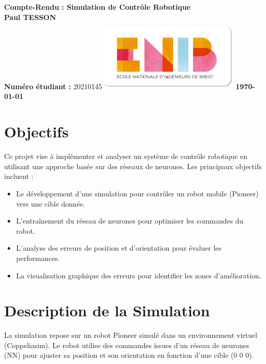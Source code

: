 \documentclass{article}
\begin{document}
\begin{titlepage}
    \centering
    \vspace*{1cm}
    \Huge
    \textbf{Compte-Rendu : Simulation de Contrôle Robotique}
    \vspace{1.5cm}
    \LARGE \\
    \textbf{Paul TESSON}
    \vspace{0.5cm}
    \large \\
    \textbf{Numéro étudiant :} 20210145
    \vfill
    \includegraphics[width=0.5\textwidth]{Logo_ENIB_2012.png}
    \vfill
    \Large
    \textbf{\today}
\end{titlepage}

\tableofcontents
\newpage
\section{Objectifs}
Ce projet vise à implémenter et analyser un système de contrôle robotique en utilisant une approche basée sur des réseaux de neurones. Les principaux objectifs incluent :
\begin{itemize}
    \item Le développement d'une simulation pour contrôler un robot mobile (Pioneer) vers une cible donnée.
    \item L'entraînement du réseau de neurones pour optimiser les commandes du robot.
    \item L'analyse des erreurs de position et d'orientation pour évaluer les performances.
    \item La visualisation graphique des erreurs pour identifier les zones d'amélioration.
\end{itemize}

\section{Description de la Simulation}
La simulation repose sur un robot Pioneer simulé dans un environnement virtuel (Coppeliasim). Le robot utilise des commandes issues d'un réseau de neurones (NN) pour ajuster sa position et son orientation en fonction d'une cible (0 0 0).
\end{document}
